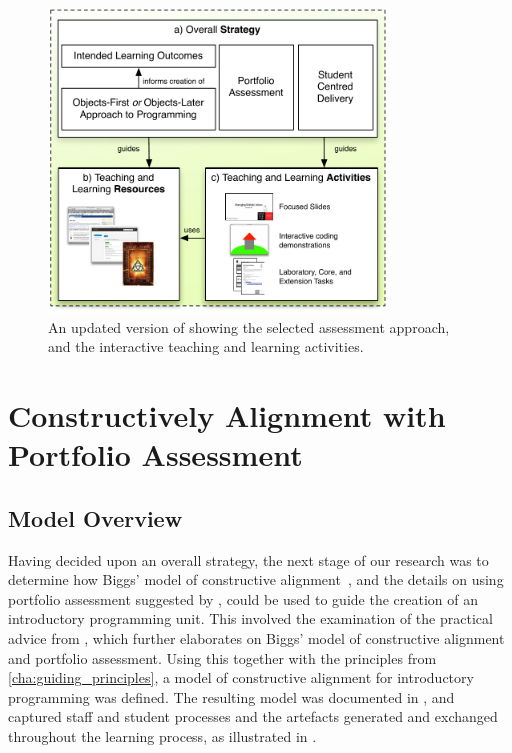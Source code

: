 \begin{figure}[hb]
	\centering
	\includegraphics[width=0.8\textwidth]{OverallStrategy}
	\caption{An updated version of  showing the selected assessment approach, and the interactive teaching and learning activities.}
	\label{fig:overall_strategy}
\end{figure}

\clearpage
\section{Constructively Alignment with Portfolio Assessment} %
\label{sec:model}

\subsection{Model Overview} %
\label{sub:model_overview}

Having decided upon an overall strategy, the next stage of our research was to determine how Biggs' model of constructive alignment~\cite{Biggs:1996c}, and the details on using portfolio assessment suggested by \citet{Biggs:1997}, could be used to guide the creation of an introductory programming unit. This involved the examination of the practical advice from \citet{Biggs:2007}, which further elaborates on Biggs' model of constructive alignment and portfolio assessment. Using this together with the principles from \cref{cha:guiding_principles}, a model of constructive alignment for introductory programming was defined. The resulting model was documented in \citet{Cain:2012a}, and captured staff and student processes and the artefacts generated and exchanged throughout the learning process, as illustrated in .

